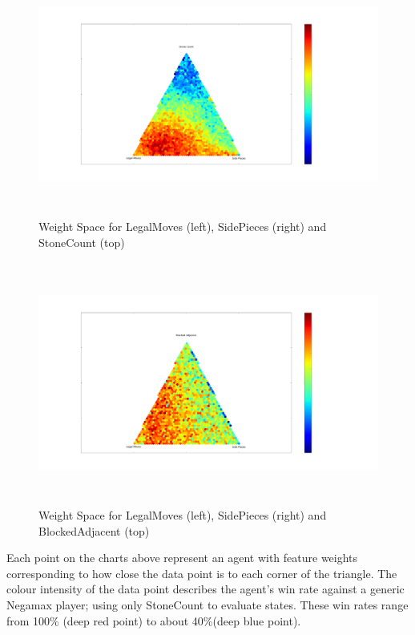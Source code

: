 \documentclass[11pt]{article}
\begin{document}
\begin{figure}[H]
  \centering
   \includegraphics[trim= 12cm 4.45cm 23cm 8cm, clip, height=8cm]{../Graphs/LegalMoves_Count_SidePieces_Triangle.pdf} 
  \caption{Weight Space for LegalMoves (left), SidePieces (right) and StoneCount (top)}
  \label{fig:triangle1}
\end{figure}

\begin{figure}[H]
  \centering
  \includegraphics[trim= 12cm 4.45cm 23cm 8cm, clip, height=8cm]{../Graphs/LegalMoves_BlockedAdjacent_SidePieces_Triangle.pdf} 
  \caption{Weight Space for LegalMoves (left), SidePieces (right) and BlockedAdjacent (top)}
  \label{fig:triangle2}
\end{figure}

Each point on the charts above represent an agent with feature weights corresponding to
how close the data point is to each corner of the triangle. The colour intensity of the data
point describes the agent's win rate against a generic Negamax player; using only StoneCount
to evaluate states. These win rates range from 100\% (deep red point) to about 40\%(deep blue point).
\end{document}
